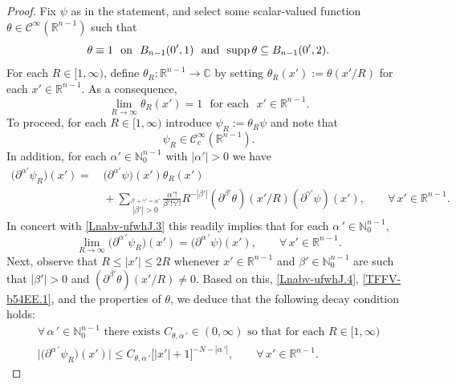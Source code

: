 \documentclass[11pt,reqno]{amsart}
\numberwithin{equation}{section}
\theoremstyle{remark}
\begin{document}
\begin{proof}
Fix $\psi$ as in the statement, and select some scalar-valued function 
$\theta\in{\mathscr{C}}^\infty({\mathbb{R}}^{n-1})$ such that 
%
\begin{equation}\label{Lnabv-ufwhJ.2}
\theta\equiv 1\,\,\text{ on }\,\,B_{n-1}(0',1)\,\,\text{ and }\,\,
{\rm supp}\,\theta\subseteq B_{n-1}(0',2).
\end{equation}
%
For each $R\in[1,\infty)$, define $\theta_R:{\mathbb{R}}^{n-1}\to{\mathbb{C}}$ 
by setting $\theta_R(x'):=\theta(x'/R)$ for each $x'\in{\mathbb{R}}^{n-1}$. 
As a consequence,
%
\begin{equation}\label{Lnabv-ufwhJ.3}
\lim\limits_{R\to\infty}\theta_R(x')=1\,\,\text{ for each }\,\,x'\in{\mathbb{R}}^{n-1}.
\end{equation}
%
To proceed, for each $R\in[1,\infty)$ introduce $\psi_R:=\theta_R\psi$ and note that
%
\begin{equation}\label{Lnabv-ufwhJ.3BIs}
\psi_R\in{\mathscr{C}}^\infty_c({\mathbb{R}}^{n-1}).
\end{equation}
%
In addition, for each $\alpha'\in{\mathbb{N}}_0^{n-1}$ with $|\alpha'|>0$ we have 
%
\begin{align}\label{Lnabv-ufwhJ.4}
\big(\partial^{\alpha'}\psi_R\big)(x')=&\,\big(\partial^{\alpha'}\psi\big)(x')\theta_R(x')
\\[4pt]
&\,+\sum_{\stackrel{\beta'+\gamma'=\alpha'}{|\beta'|>0}}
\frac{\alpha'!}{\beta'!\gamma'!}R^{-|\beta'|}(\partial^{\beta'}\theta)(x'/R)
(\partial^{\gamma'}\psi)(x'),\qquad\forall\,x'\in{\mathbb{R}}^{n-1}.
\nonumber
\end{align}
%
In concert with \eqref{Lnabv-ufwhJ.3} this readily implies that for each $\alpha\,'\in{\mathbb{N}}_0^{n-1}$,
%
\begin{equation}\label{Lnabv-ufwhJ.5}
\lim_{R\to\infty}\big(\partial^{\alpha\,'}\psi_R\big)(x')
=\big(\partial^{\alpha\,'}\psi\big)(x'),\qquad\forall\,x'\in{\mathbb{R}}^{n-1}.
\end{equation}
%
Next, observe that $R\leq |x'|\leq 2R$ whenever $x'\in{\mathbb{R}}^{n-1}$ and 
$\beta'\in{\mathbb{N}}_0^{n-1}$ are such that $|\beta'|>0$ and 
$(\partial^{\beta'}\theta)(x'/R)\not=0$. Based on this, \eqref{Lnabv-ufwhJ.4}, 
\eqref{TFFV-b54EE.1}, and the properties of $\theta$, we deduce that 
the following decay condition holds:
%
\begin{equation}\label{Lnabv-ufwhJ.6}
\begin{array}{c}
\text{$\forall\,\alpha\,'\in{\mathbb{N}}_0^{n-1}$ there 
exists $C_{\theta,\alpha\,'}\in(0,\infty)$ so that for each $R\in[1,\infty)$}
\\[6pt]
\big|\big(\partial^{\alpha\,'}\psi_R\big)(x')\big|
\leq C_{\theta,\alpha\,'}\big[|x'|+1\big]^{-N-|\alpha\,'|},
\qquad\forall\,x'\in{\mathbb{R}}^{n-1}.
\end{array}
\end{equation}


\end{proof}
\end{document}
